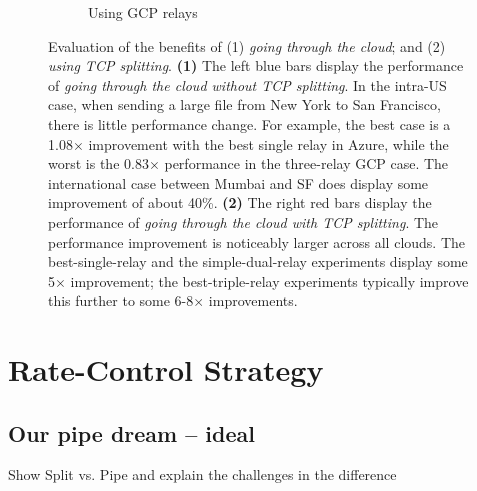 \documentclass[10pt,sigconf]{acmart}
\begin{document}
\begin{figure}[t!]
\begin{subfigure}{.32\textwidth}
    \caption{Using GCP relays}
    \label{fig:must-split-gcp}
\end{subfigure}
\caption{Evaluation of the benefits of (1) \textit{going through the cloud}; and (2) \textit{using TCP splitting}. \textbf{(1)} The left blue bars display the performance of \textit{going through the cloud without TCP splitting}. In the intra-US case, when sending a large file from New York to San Francisco, there is little performance change. For example, the best case is a 1.08$\times$ improvement with the best single relay in Azure, while the worst is the 0.83$\times$ performance in the three-relay GCP case. The international case between Mumbai and SF does display some improvement of about 40\%. \textbf{(2)} The right red bars display the performance of \textit{going through the cloud with TCP splitting}. The performance improvement is noticeably larger across all clouds. The best-single-relay and the simple-dual-relay experiments display some 5$\times$ improvement; the best-triple-relay experiments typically improve this further to some 6-8$\times$ improvements.
}
\label{fig:must-split}
\end{figure}







\section{Rate-Control Strategy}

\subsection{Our pipe dream -- ideal}

Show Split vs. Pipe and explain the challenges in the difference
\end{document}
